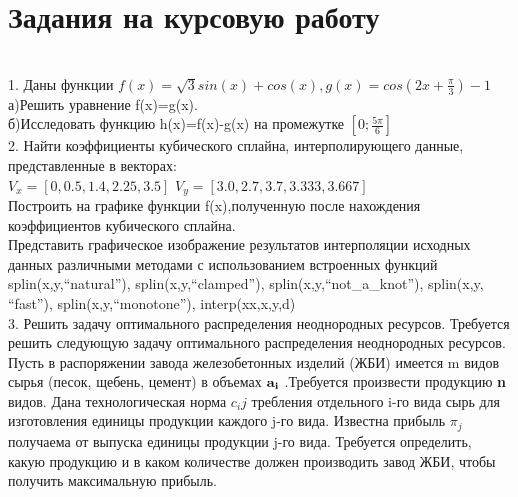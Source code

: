 \documentclass[russian,utf8,nocolumnxxxi,nocolumnxxxii]{eskdtext}
\begin{document}
\section{Задания на курсовую работу}
\\1. Даны функции $f(x)=\sqrt{3}sin(x)+cos(x),g(x)=cos(2x+\frac{\pi}{3})-1$
\\а)Решить уравнение f(x)=g(x).
\\б)Исследовать функцию h(x)=f(x)-g(x) на промежутке $[0;\frac{5\pi}{6}]$
\\2. Найти коэффициенты кубического сплайна, интерполирующего данные, представленные в векторах:\\
$V_{x}=[0,0.5,1.4,2.25,3.5]$
$V_{y}=[3.0,2.7,3.7,3.333,3.667]$\\
Построить на графике функции f(x),полученную после нахождения коэффициентов кубического сплайна. \\
Представить графическое изображение результатов интерполяции исходных данных различными методами с использованием встроенных функций
\\splin(x,y,“natural”), splin(x,y,“clamped”), splin(x,y,“not\_a\_knot”), splin(x,y, “fast”), splin(x,y,“monotone”), interp(xx,x,y,d)\\
3. Решить задачу оптимального распределения неоднородных ресурсов.
Требуется решить следующую задачу оптимального распределения неоднородных ресурсов. Пусть в распоряжении завода железобетонных изделий (ЖБИ) имеется m видов сырья (песок, щебень, цемент) в объемах ${\bf a_i}$ .Требуется произвести продукцию {\bf n} видов. Дана технологическая норма $c_ij$ требления отдельного i-го вида сырь для изготовления единицы продукции каждого j-го вида. Известна прибыль $\pi_j$ получаема от выпуска единицы продукции j-го вида. Требуется определить, какую продукцию и в каком количестве должен производить завод ЖБИ, чтобы получить максимальную прибыль.
\begin{center}
\begin{minipage}[h]{0.65\linewidth}
 \\
\end{minipage}
\end{center}

\newpage
\end{document}
